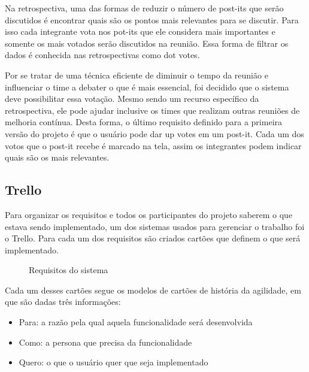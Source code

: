 Na retrospectiva, uma das formas de reduzir o número de post-its que serão discutidos é encontrar quais são os pontos mais relevantes para se discutir. Para isso cada integrante vota nos pot-its que ele considera mais importantes e somente os mais votados serão discutidos na reunião. Essa forma de filtrar os dados é conhecida nas retrospectivas como dot votes.

Por se tratar de uma técnica eficiente de diminuir o tempo da reunião e influenciar o time a debater o que é mais essencial, foi decidido que o sistema deve possibilitar essa votação. Mesmo sendo um recurso específico da retrospectiva, ele pode ajudar inclusive os times que realizam outras reuniões de melhoria contínua. Desta forma, o último requisito definido para a primeira versão do projeto é que o usuário pode dar up votes em um post-it. Cada um dos votos que o post-it recebe é marcado na tela, assim os integrantes podem indicar quais são os mais relevantes.

\subsection{Trello}

Para organizar os requisitos e todos os participantes do projeto saberem o que estava sendo implementado, um dos sistemas usados para gerenciar o trabalho foi o Trello. Para cada um dos requisitos são criados cartões que definem o que será implementado.

\begin{figure}[H]
  \centering
  \caption{Requisitos do sistema}\label{figura:requisitos}
\end{figure}

Cada um desses cartões segue os modelos de cartões de história da agilidade, em que são dadas três informações:

\begin{itemize}
	\item Para: a razão pela qual aquela funcionalidade será desenvolvida
	\item Como: a persona que precisa da funcionalidade
	\item Quero: o que o usuário quer que seja implementado
\end{itemize}

